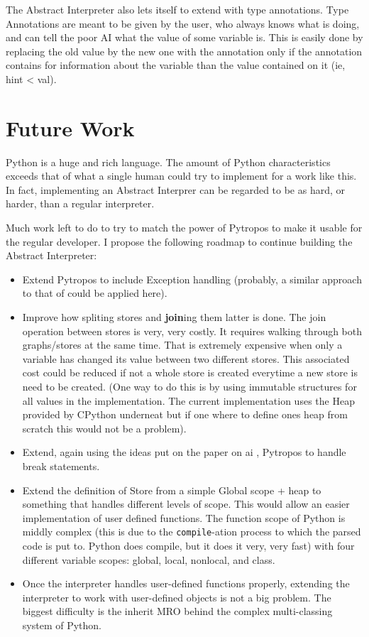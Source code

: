 \documentclass[
11pt, %
english, %
singlespacing, %
headsepline, %
]{MastersDoctoralThesis} %
\providecommand{\tightlist}{%
  \setlength{\itemsep}{0pt}\setlength{\parskip}{0pt}}
\begin{document}
The Abstract Interpreter also lets itself to extend with type
annotations. Type Annotations are meant to be given by the user, who
always knows what is doing, and can tell the poor AI what the value of
some variable is. This is easily done by replacing the old value by the
new one with the annotation only if the annotation contains for
information about the variable than the value contained on it (ie, hint
\textless{} val).

\hypertarget{future-work}{%
\section{Future Work}\label{future-work}}

Python is a huge and rich language. The amount of Python characteristics
exceeds that of what a single human could try to implement for a work
like this. In fact, implementing an Abstract Interprer can be regarded
to be as hard, or harder, than a regular interpreter.

Much work left to do to try to match the power of Pytropos to make it
usable for the regular developer. I propose the following roadmap to
continue building the Abstract Interpreter:

\begin{itemize}
\tightlist
\item
  Extend Pytropos to include Exception handling (probably, a similar
  approach to that of {} could be
  applied here).
\item
  Improve how spliting stores and \textbf{join}ing them latter is
  done. The join operation between stores is very, very costly. It
  requires walking through both graphs/stores at the same time. That is
  extremely expensive when only a variable has changed its value between
  two different stores. This associated cost could be reduced if not a
  whole store is created everytime a new store is need to be created.
  (One way to do this is by using immutable structures for all values in
  the implementation. The current implementation uses the Heap provided
  by CPython underneat but if one where to define ones heap from scratch
  this would not be a problem).
\item
  Extend, again using the ideas put on the paper on ai {}, Pytropos to handle break statements.
\item
  Extend the definition of Store from a simple Global scope + heap to
  something that handles different levels of scope. This would allow an
  easier implementation of user defined functions. The function scope of
  Python is middly complex (this is due to the \texttt{compile}-ation
  process to which the parsed code is put to. Python does compile, but
  it does it very, very fast) with four different variable scopes:
  global, local, nonlocal, and class.
\item
  Once the interpreter handles user-defined functions properly,
  extending the interpreter to work with user-defined objects is not a
  big problem. The biggest difficulty is the inherit MRO behind the
  complex multi-classing system of Python.
\end{itemize}
\end{document}

